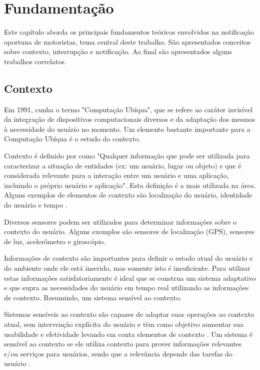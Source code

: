 
\chapter{Fundamentação}
\label{fundamentacao}
Este capítulo aborda os principais fundamentos teóricos envolvidos na notificação oportuna de motoristas,
tema central deste trabalho. São apresentados conceitos sobre contexto, interrupção e notificação.
Ao final são apresentados alguns trabalhos correlatos.

\section{Contexto}
\label{contexto}
Em 1991, \cite{weiser1991computer} cunha o termo "Computação Ubíqua", que se refere ao caráter invisível da
integração de dispositivos computacionais diversos e da adaptação dos mesmos à necessidade do usuário no momento.
Um elemento bastante importante para a Computação Ubíqua é o estudo do contexto.

Contexto é definido por \cite{dey2001understanding} como "Qualquer informação que pode ser utilizada para
caracterizar a situação de entidades (ex: um usuário, lugar ou objeto) e que é considerada relevante para
a interação entre um usuário e uma aplicação, incluindo o próprio usuário e aplicação". Esta definição é
a mais utilizada na área. Alguns exemplos de elementos de contexto são
localização do usuário, identidade do usuário e tempo \cite{ryan1999enhanced}.

Diversos sensores podem ser utilizados para determinar informações sobre o contexto do usuário. Alguns exemplos são
sensores de localização (GPS), sensores de luz, acelerômetro e giroscópio.

Informações de contexto são importantes para definir o estado atual do usuário e do ambiente onde ele está inserido,
mas somente isto é insuficiente. Para utilizar estas informações satisfatoriamente é ideal que se construa um sistema
adaptativo e que supra as necessidades do usuário em tempo real utilizando as informações de contexto. Resumindo,
um sistema sensível ao contexto.

Sistemas sensíveis ao contexto são capazes de adaptar suas operações ao contexto atual, sem intervenção
explícita do usuário e têm como objetivo aumentar sua usabilidade e efetividade levando em conta elementos
de contexto \cite{baldauf2007survey}.  Um sistema é sensível ao contexto se ele utiliza contexto para prover
informações relevantes e/ou serviços para usuários, sendo que a relevância depende das tarefas do usuário
\cite{abowd1999towards}.

